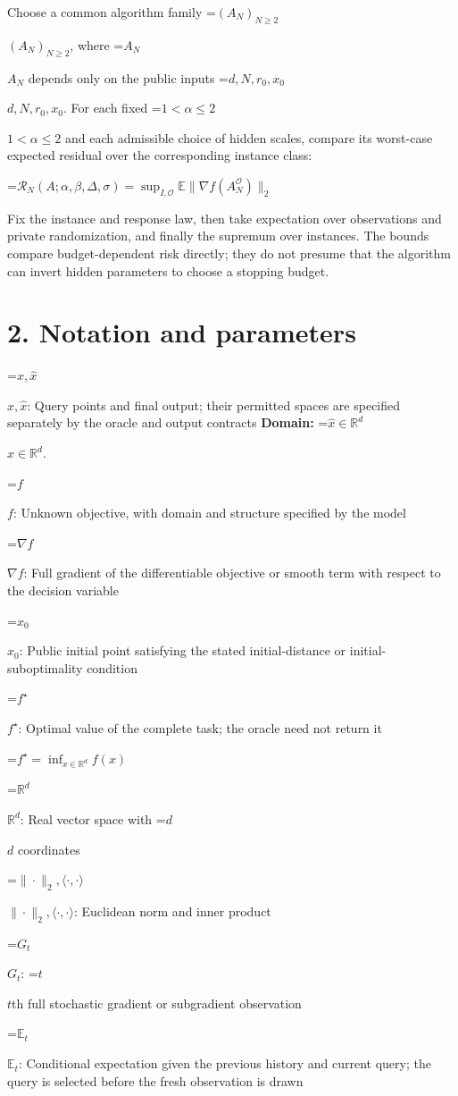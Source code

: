\documentclass[10pt,a4paper]{article}
\newcommand{\AtlasMath}[1]{\par\begingroup\centering\setbox0=\hbox{$\displaystyle #1$}\ifdim\wd0>1.4\linewidth\typeout{ATLAS WIDE FORMULA: \the\wd0}\fi\ifdim\wd0>\linewidth\resizebox{\linewidth}{!}{\box0}\else\box0\fi\par\endgroup}
\newcommand{\AtlasInlineMath}[1]{\begingroup\setbox0=\hbox{$#1$}\ifdim\wd0>.4\linewidth\endgroup\AtlasMath{#1}\else\endgroup$#1$\fi}
\begin{document}
Choose a common algorithm family \AtlasInlineMath{(A_N)_{N\ge2}}, where \AtlasInlineMath{A_N} depends only on the public inputs \AtlasInlineMath{d,N,r_0,x_0}. For each fixed \AtlasInlineMath{1<\alpha\le2} and each admissible choice of hidden scales, compare its worst-case expected residual over the corresponding instance class:


\AtlasMath{\mathcal{R}_N(A;\alpha,\beta,\Delta,\sigma)=\sup_{I,\mathcal{O}}\mathbb{E}\|\nabla f(A_N^{\mathcal{O}})\|_2}


Fix the instance and response law, then take expectation over observations and private randomization, and finally the supremum over instances. The bounds compare budget-dependent risk directly; they do not presume that the algorithm can invert hidden parameters to choose a stopping budget.

\section{2. Notation and parameters}
\AtlasInlineMath{x,\widehat{x}}: Query points and final output; their permitted spaces are specified separately by the oracle and output contracts \textbf{Domain:} \AtlasInlineMath{\widehat{x}\in \mathbb{R}^d}.

\AtlasInlineMath{f}: Unknown objective, with domain and structure specified by the model

\AtlasInlineMath{\nabla f}: Full gradient of the differentiable objective or smooth term with respect to the decision variable

\AtlasInlineMath{x_0}: Public initial point satisfying the stated initial-distance or initial-suboptimality condition

\AtlasInlineMath{f^\star}: Optimal value of the complete task; the oracle need not return it


\AtlasMath{f^\star=\inf_{x\in \mathbb{R}^d}f(x)}


\AtlasInlineMath{\mathbb{R}^d}: Real vector space with \AtlasInlineMath{d} coordinates

\AtlasInlineMath{\|\cdot\|_2,\langle\cdot,\cdot\rangle}: Euclidean norm and inner product

\AtlasInlineMath{G_t}: \AtlasInlineMath{t}th full stochastic gradient or subgradient observation

\AtlasInlineMath{\mathbb{E}_t}: Conditional expectation given the previous history and current query; the query is selected before the fresh observation is drawn
\end{document}
